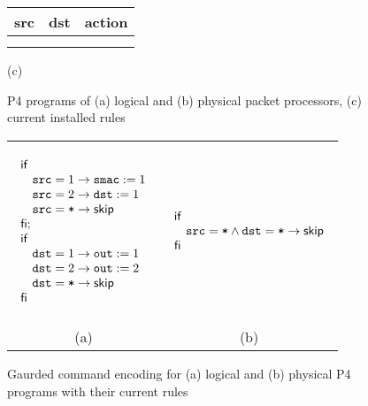 \begin{figure}
\begin{ttfamily}
\begin{footnotesize}
\begin{multicols}{3}
\columnbreak

\begin{tabular}{c|c|c}
 {\ttfamily src} & {\ttfamily dst} & action \\\hline
                 &                 &        \\
                 &                 &        \\
\end{tabular}
\end{multicols}
\end{footnotesize}
\end{ttfamily}

\vspace*{-4pt}
\centering (c)


\caption{P4 programs of (a) logical and (b) physical packet processors, (c) current installed rules\label{fig:running-p4}}
\end{figure}

\begin{figure}
\begin{tabular}{c@{\hskip 1.5em}|@{\hskip 1.5em}c}
\begin{small}
$
        \begin{array}{l}
          \IF \\
          \phantom{\IF}~\var{src} = 1 \to \var{smac} := 1 \\
          \phantom{\IF}~\var{src} = 2 \to \var{dst} := 1\\
          \phantom{\IF}~\var{src} = \var{*} \to \SKIP \\
          \ENDIF ; \\
          \IF \\
          \phantom{\IF}~\var{dst} = 1 \to \var{out} := 1 \\
          \phantom{\IF}~\var{dst} = 2 \to \var{out} := 2 \\
          \phantom{\IF}~\var{dst} = \var{*} \to \SKIP \\
          \ENDIF
        \end{array}
$
\end{small}
&
\begin{small}
$
        \begin{array}{l}
          \IF~\\
          \phantom{\IF}~\var{src} = \var{*} \wedge \var{dst} = \var{*}\to \SKIP \\
          \ENDIF 
        \end{array}
$
\end{small}
\\
(a)
&
(b)
\end{tabular}

\caption{Gaurded command encoding for (a) logical and (b) physical P4 programs with their current rules\label{fig:encoding}}
\end{figure}
